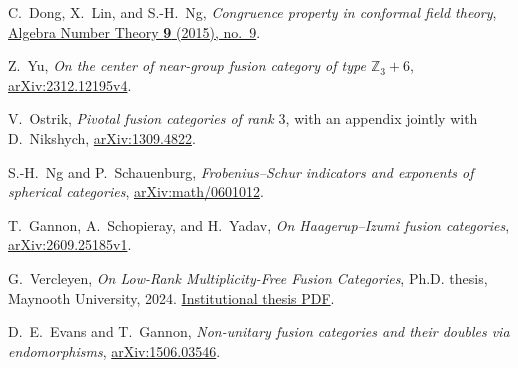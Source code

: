 C.~Dong, X.~Lin, and S.-H.~Ng,
\emph{Congruence property in conformal field theory},
\href{https://msp.org/ant/2015/9-9/ant-v9-n9-p03-s.pdf}{Algebra Number Theory
\textbf{9} (2015), no.~9}.

Z.~Yu,
\emph{On the center of near-group fusion category of type $\mathbb Z_3+6$},
\href{https://arxiv.org/abs/2312.12195v4}{arXiv:2312.12195v4}.

V.~Ostrik,
\emph{Pivotal fusion categories of rank $3$},
with an appendix jointly with D.~Nikshych,
\href{https://arxiv.org/abs/1309.4822}{arXiv:1309.4822}.

S.-H.~Ng and P.~Schauenburg,
\emph{Frobenius--Schur indicators and exponents of spherical categories},
\href{https://arxiv.org/abs/math/0601012}{arXiv:math/0601012}.

T.~Gannon, A.~Schopieray, and H.~Yadav,
\emph{On Haagerup--Izumi fusion categories},
\href{https://arxiv.org/abs/2609.25185v1}{arXiv:2609.25185v1}.

G.~Vercleyen,
\emph{On Low-Rank Multiplicity-Free Fusion Categories},
Ph.D. thesis, Maynooth University, 2024.
\href{https://mural.maynoothuniversity.ie/id/eprint/18958/1/phd.pdf}{Institutional thesis PDF}.

D.~E.~Evans and T.~Gannon,
\emph{Non-unitary fusion categories and their doubles via endomorphisms},
\href{https://arxiv.org/abs/1506.03546}{arXiv:1506.03546}.
